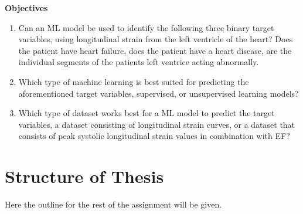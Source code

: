 \begin{tcolorbox}
    \textbf{Objectives}

    \begin{enumerate}
        \item Can an ML model be used to identify the following three binary target variables, using longitudinal strain from the left ventricle of the heart? Does the patient have heart failure, does the patient have a heart disease, are the individual segments of the patients left ventrice acting abnormally.
        \item Which type of machine learning is best suited for predicting the aforementioned target variables, supervised, or unsupervised learning models?
        \item Which type of dataset works best for a ML model to predict the target variables, a dataset consisting of longitudinal strain curves, or a dataset that consists of peak systolic longitudinal strain values in combination with EF?
    \end{enumerate}
\end{tcolorbox}

\section{Structure of Thesis}

Here the outline for the rest of the assignment will be given. \smallskip
